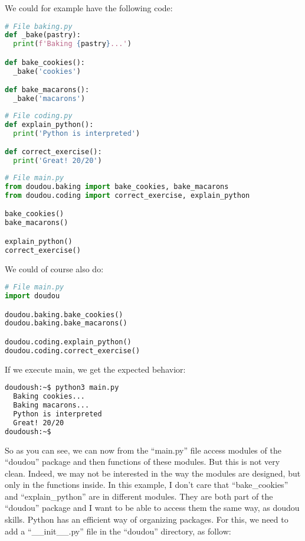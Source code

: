 \vspace{5mm}


We could for example have the following code:

\begin{lstlisting}[language=python]
# File baking.py
def _bake(pastry):
  print(f'Baking {pastry}...')

def bake_cookies():
  _bake('cookies')

def bake_macarons():
  _bake('macarons')
\end{lstlisting}

\begin{lstlisting}[language=python]
# File coding.py
def explain_python():
  print('Python is interpreted')

def correct_exercise():
  print('Great! 20/20')
\end{lstlisting}

\begin{lstlisting}[language=python]
# File main.py
from doudou.baking import bake_cookies, bake_macarons
from doudou.coding import correct_exercise, explain_python

bake_cookies()
bake_macarons()

explain_python()
correct_exercise()
\end{lstlisting}

We could of course also do:
\begin{lstlisting}[language=python]
# File main.py
import doudou

doudou.baking.bake_cookies()
doudou.baking.bake_macarons()

doudou.coding.explain_python()
doudou.coding.correct_exercise()
\end{lstlisting}

If we execute main, we get the expected behavior:

\begin{lstlisting}[language=bash]
doudoush:~$ python3 main.py
  Baking cookies...
  Baking macarons...
  Python is interpreted
  Great! 20/20
doudoush:~$
\end{lstlisting}

So as you can see, we can now from the ``main.py'' file access modules of the ``doudou''
package and then functions of these modules. But this is not very clean. Indeed, we may
not be interested in the way the modules are designed, but only in the functions inside.
In this example, I don't care that ``bake\_cookies'' and ``explain\_python'' are in
different modules. They are both part of the ``doudou'' package and I want to be able to
access them the same way, as doudou skills. Python has an efficient way of organizing
packages. For this, we need to add a ``\_\_init\_\_.py'' file in the ``doudou'' directory,
as follow:

